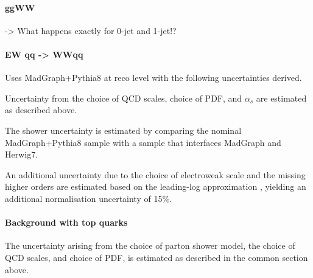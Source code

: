 \paragraph{ggWW} 
-> What happens exactly for 0-jet and 1-jet!?


\paragraph{EW qq -> WWqq}
Uses MadGraph+Pythia8 at reco level with the following uncertainties derived.

Uncertainty from the choice of QCD scales, choice of PDF, and $\alpha_s$ are estimated as described above.

The shower uncertainty is estimated by comparing the nominal MadGraph+Pythia8 sample with a sample that interfaces MadGraph and Herwig7. 

An additional uncertainty due to the choice of electroweak scale and the missing higher orders are estimated based on the leading-log approximation \cite{Denner_2019}, yielding an additional normalisation uncertainty of 15\%. 




\paragraph{Background with top quarks}

The uncertainty arising from the choice of parton shower model, the choice of QCD scales, and choice of PDF, is estimated as described in the common section above. 

